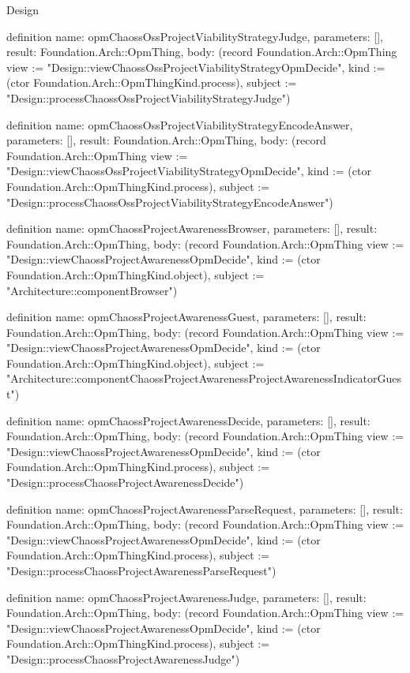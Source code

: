 \begin{lexlean}{Design}
\begin{semanticmodule}
definition{
  name: opmChaossOssProjectViabilityStrategyJudge,
  parameters: [],
  result: Foundation.Arch::OpmThing,
  body: (record Foundation.Arch::OpmThing {view := "Design::viewChaossOssProjectViabilityStrategyOpmDecide", kind := (ctor Foundation.Arch::OpmThingKind.process), subject := "Design::processChaossOssProjectViabilityStrategyJudge"})
}

definition{
  name: opmChaossOssProjectViabilityStrategyEncodeAnswer,
  parameters: [],
  result: Foundation.Arch::OpmThing,
  body: (record Foundation.Arch::OpmThing {view := "Design::viewChaossOssProjectViabilityStrategyOpmDecide", kind := (ctor Foundation.Arch::OpmThingKind.process), subject := "Design::processChaossOssProjectViabilityStrategyEncodeAnswer"})
}

definition{
  name: opmChaossProjectAwarenessBrowser,
  parameters: [],
  result: Foundation.Arch::OpmThing,
  body: (record Foundation.Arch::OpmThing {view := "Design::viewChaossProjectAwarenessOpmDecide", kind := (ctor Foundation.Arch::OpmThingKind.object), subject := "Architecture::componentBrowser"})
}

definition{
  name: opmChaossProjectAwarenessGuest,
  parameters: [],
  result: Foundation.Arch::OpmThing,
  body: (record Foundation.Arch::OpmThing {view := "Design::viewChaossProjectAwarenessOpmDecide", kind := (ctor Foundation.Arch::OpmThingKind.object), subject := "Architecture::componentChaossProjectAwarenessProjectAwarenessIndicatorGuest"})
}

definition{
  name: opmChaossProjectAwarenessDecide,
  parameters: [],
  result: Foundation.Arch::OpmThing,
  body: (record Foundation.Arch::OpmThing {view := "Design::viewChaossProjectAwarenessOpmDecide", kind := (ctor Foundation.Arch::OpmThingKind.process), subject := "Design::processChaossProjectAwarenessDecide"})
}

definition{
  name: opmChaossProjectAwarenessParseRequest,
  parameters: [],
  result: Foundation.Arch::OpmThing,
  body: (record Foundation.Arch::OpmThing {view := "Design::viewChaossProjectAwarenessOpmDecide", kind := (ctor Foundation.Arch::OpmThingKind.process), subject := "Design::processChaossProjectAwarenessParseRequest"})
}

definition{
  name: opmChaossProjectAwarenessJudge,
  parameters: [],
  result: Foundation.Arch::OpmThing,
  body: (record Foundation.Arch::OpmThing {view := "Design::viewChaossProjectAwarenessOpmDecide", kind := (ctor Foundation.Arch::OpmThingKind.process), subject := "Design::processChaossProjectAwarenessJudge"})
}


\end{semanticmodule}
\end{lexlean}
